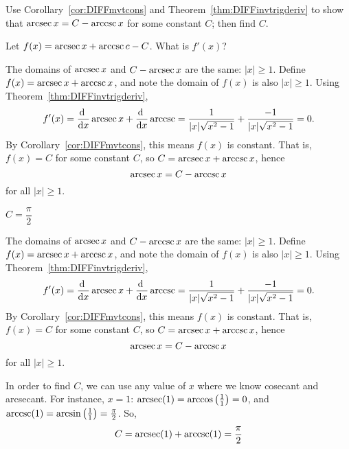 \begin{question}
Use  Corollary~\ref*{cor:DIFFmvtcons} %
and Theorem~\ref*{thm:DIFFinvtrigderiv}
 to show that $\mathop{\mathrm{arcsec}} x=C-\mathop{\mathrm{arccsc}} x$ for some constant $C$; then find $C$.
\end{question}
\begin{hint}
Let $f(x)=\mathop{\mathrm{arcsec}} x + \mathop{\mathrm{arccsc}} c -C$. %
What is $f'(x)$?
\end{hint}
\begin{answer}
The domains of $\mathop{\mathrm{arcsec}} x$ and $C-\mathop{\mathrm{arcsec}} x$ are the same: $|x| \geq 1$.
Define $f(x)=\mathop{\mathrm{arcsec}} x + \mathop{\mathrm{arccsc}} x$, and note the domain of $f(x)$ is also $|x| \geq 1$.
Using Theorem~\ref*{thm:DIFFinvtrigderiv},
\[f'(x)=\diff{}{x}\arcsec x+\diff{}{x} \arccsc
 = \dfrac{1}{|x|\sqrt{x^2-1}}+\dfrac{-1}{|x|\sqrt{x^2-1}}=0.\]
By Corollary~\ref*{cor:DIFFmvtcons}, this means $f(x)$ is constant.
That is, $f(x)=C$ for some constant $C$, so $C=\mathop{\mathrm{arcsec}} x + \mathop{\mathrm{arccsc}} x$, hence
\[\mathop{\mathrm{arcsec}} x = C-\mathop{\mathrm{arccsc}} x\]
for all $|x| \geq 1$.
\medskip

$C=\dfrac{\pi}{2}$
\end{answer}
\begin{solution}
The domains of $\mathop{\mathrm{arcsec}} x$ and $C-\mathop{\mathrm{arccsc}} x$ are the same: $|x| \geq 1$.
Define $f(x)=\mathop{\mathrm{arcsec}} x + \mathop{\mathrm{arccsc}} x$, and note the domain of $f(x)$ is also $|x| \geq 1$.
Using Theorem~\ref*{thm:DIFFinvtrigderiv},
\[f'(x)=\diff{}{x}\arcsec x+\diff{}{x} \arccsc
 = \dfrac{1}{|x|\sqrt{x^2-1}}+\dfrac{-1}{|x|\sqrt{x^2-1}}=0.\]
By Corollary~\ref*{cor:DIFFmvtcons}, this means $f(x)$ is constant.
That is, $f(x)=C$ for some constant $C$, so $C=\mathop{\mathrm{arcsec}} x + \mathop{\mathrm{arccsc}} x$, hence
\[\mathop{\mathrm{arcsec}} x = C-\mathop{\mathrm{arccsc}} x\]
for all $|x| \geq 1$.

In order to find $C$, we can use any value of $x$ where we know cosecant and arcsecant. For instance, $x=1$: $\mathop{\mathrm{arcsec}}(1)=\arccos\left(\frac{1}{1}\right)=0$,
and $\mathop{\mathrm{arccsc}}(1)=\arcsin\left(\frac{1}{1}\right)=\frac{\pi}{2}$. So,
\[C=\mathop{\mathrm{arcsec}}(1)+\mathop{\mathrm{arccsc}}(1)=\frac{\pi}{2}\]
\end{solution}


\subsection*{\Application}


